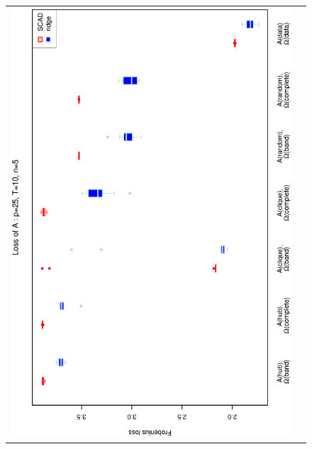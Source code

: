 \begin{figure}[h!]
\centering
\begin{tabular}{cc}
\includegraphics[scale=0.45,angle=270]{LossA25T10N5_25.eps}
\\

\end{tabular}
\end{figure}
